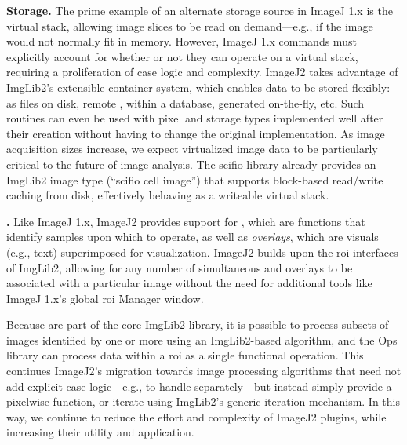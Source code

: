 \documentclass{bmcart}
\begin{document}
\textbf{Storage.} The prime example of an alternate storage source in ImageJ
1.x is the virtual stack, allowing image slices to be read on demand---e.g., if
the image would not normally fit in memory. However, ImageJ 1.x commands must
explicitly account for whether or not they can operate on a virtual stack,
requiring a proliferation of case logic and complexity. ImageJ2 takes advantage
of ImgLib2's extensible container system, which enables data to be stored
flexibly: as files on disk, remote , within a database,
generated on-the-fly, etc. Such routines can even be used with pixel and
storage types implemented well after their creation without having to change
the original implementation. As image acquisition sizes increase, we expect
virtualized image data to be particularly critical to the future of image
analysis. The \acrshort{scifio} library already provides an ImgLib2 image type
(``\acrshort{scifio} cell image'') that supports block-based read/write caching
from disk, effectively behaving as a writeable virtual stack.

\textbf{.} Like ImageJ 1.x, ImageJ2 provides support for
\textit{}, which are functions that identify samples upon which
to operate, as well as \textit{overlays}, which are visuals (e.g., text)
superimposed for visualization. ImageJ2 builds upon the \acrshort{roi}
interfaces of ImgLib2, allowing for any number of simultaneous 
and overlays to be associated with a particular image without the need for
additional tools like ImageJ 1.x's global \acrshort{roi} Manager window.

Because  are part of the core ImgLib2 library, it is possible
to process subsets of images identified by one or more  using
an ImgLib2-based algorithm, and the Ops library can process data within a
\acrshort{roi} as a single functional operation. This continues ImageJ2's
migration towards image processing algorithms that need not add explicit case
logic---e.g., to handle  separately---but instead simply
provide a pixelwise function, or iterate using ImgLib2's generic iteration
mechanism. In this way, we continue to reduce the effort and complexity of
ImageJ2 plugins, while increasing their utility and application.
\end{document}
